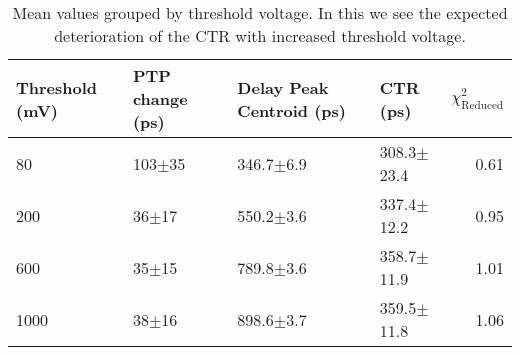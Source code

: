 \begin{table}
\caption{\label{tab:thresholdtest} Mean values grouped by threshold voltage. In this we see the expected deterioration of the CTR with increased threshold voltage.}
\begin{tabular}{llllr}
\hline
Threshold (mV) & PTP change (ps) & Delay Peak Centroid (ps) & CTR (ps) & $\chi^2_\text{Reduced}$\\
\hline
80        &  103$\pm$35 &  346.7$\pm$6.9 &  308.3$\pm$23.4 &        0.61 \\
200       &   36$\pm$17 &  550.2$\pm$3.6 &  337.4$\pm$12.2 &        0.95 \\
600       &   35$\pm$15 &  789.8$\pm$3.6 &  358.7$\pm$11.9 &        1.01 \\
1000      &   38$\pm$16 &  898.6$\pm$3.7 &  359.5$\pm$11.8 &        1.06 \\
\hline
\end{tabular}
\end{table}